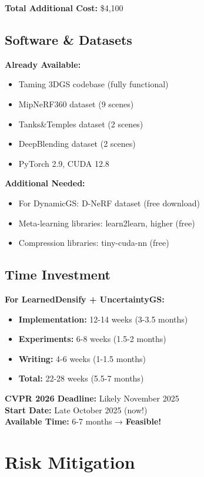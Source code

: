 \documentclass[11pt,letterpaper]{article}
\begin{document}
\textbf{Total Additional Cost:} \$4,100

\subsection{Software \& Datasets}

\textbf{Already Available:}
\begin{itemize}[leftmargin=*]
    \item Taming 3DGS codebase (fully functional)
    \item MipNeRF360 dataset (9 scenes)
    \item Tanks\&Temples dataset (2 scenes)
    \item DeepBlending dataset (2 scenes)
    \item PyTorch 2.9, CUDA 12.8
\end{itemize}

\textbf{Additional Needed:}
\begin{itemize}[leftmargin=*]
    \item For DynamicGS: D-NeRF dataset (free download)
    \item Meta-learning libraries: learn2learn, higher (free)
    \item Compression libraries: tiny-cuda-nn (free)
\end{itemize}

\subsection{Time Investment}

\textbf{For LearnedDensify + UncertaintyGS:}
\begin{itemize}[leftmargin=*]
    \item \textbf{Implementation:} 12-14 weeks (3-3.5 months)
    \item \textbf{Experiments:} 6-8 weeks (1.5-2 months)
    \item \textbf{Writing:} 4-6 weeks (1-1.5 months)
    \item \textbf{Total:} 22-28 weeks (5.5-7 months)
\end{itemize}

\textbf{CVPR 2026 Deadline:} Likely November 2025 \\
\textbf{Start Date:} Late October 2025 (now!) \\
\textbf{Available Time:} 6-7 months → \textbf{Feasible!}

\section{Risk Mitigation}
\end{document}
